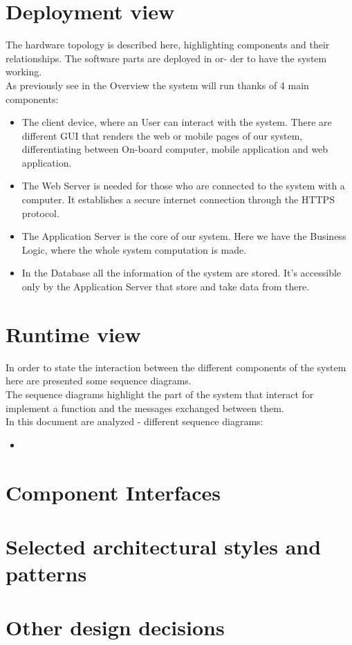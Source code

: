 \section{Deployment view}
The hardware topology is described here, highlighting components and their relationships. The software parts are deployed in or-
der to have the system working.
\\As previously see in the Overview the system will run thanks of 4 main components:
\begin{itemize}
	\item{The client device, where an User can interact with the system. There are different GUI that renders the web or mobile pages of our system, differentiating between On-board computer, mobile application and web application.}
	\item{ The Web Server is needed for those who are connected to the system with a computer. It establishes a secure internet connection through the HTTPS protocol.}
	\item{The Application Server is the core of our system. Here we have the Business Logic, where the whole system computation is
made.}
	\item{In the Database all the information of the system are stored. It's accessible only by the Application Server that store and take data from there.}
\end{itemize} 


\section{Runtime view}
In order to state the interaction between the different components of the system here are presented some sequence diagrams.
\\The sequence diagrams highlight the part of the system that interact for implement a function and the messages exchanged between them.
\\In this document are analyzed - different sequence diagrams: %
\begin{itemize}%
	\item %
\end{itemize} 



\section{Component Interfaces}
	\blindtext
\section{Selected architectural styles and patterns}
	\blindtext
\section{Other design decisions}
	\blindtext